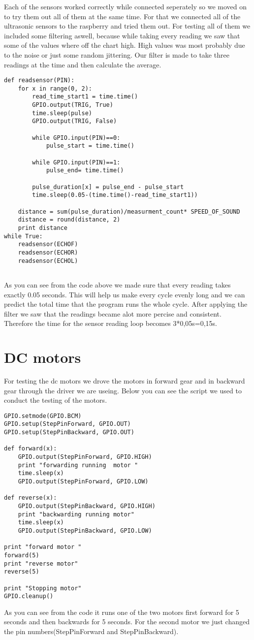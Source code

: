 Each of the sensors worked correctly while connected seperately so we moved on to try them out all of them at the same time.
For that we connected all of the ultrasonic sensors to the raspberry and tried them out.
For testing all of them we included some filtering aswell, because while taking every reading we saw that some of the values where off the chart high.
High values was most probably due to the noise or just some random jittering.
Our filter is made to take three readings at the time and then calculate the average.

\begin{lstlisting}
def readsensor(PIN):
	for x in range(0, 2):
		read_time_start1 = time.time()
		GPIO.output(TRIG, True)
		time.sleep(pulse)
		GPIO.output(TRIG, False)

		while GPIO.input(PIN)==0:
			pulse_start = time.time()

		while GPIO.input(PIN)==1:
			pulse_end= time.time()

		pulse_duration[x] = pulse_end - pulse_start
		time.sleep(0.05-(time.time()-read_time_start1))

	distance = sum(pulse_duration)/measurment_count* SPEED_OF_SOUND
	distance = round(distance, 2)
	print distance
while True:
	readsensor(ECHOF)
	readsensor(ECHOR)
	readsensor(ECHOL)
	
\end{lstlisting}

As you can see from the code above we made sure that every reading takes exactly 0.05 seconds.
This will help us make every cycle evenly long and we can predict the total time that the program runs the whole cycle.
After applying the filter we saw that the readings became alot more percise and consistent.
Therefore the time for the sensor reading loop becomes 3*0,05s=0,15s.

\section{DC motors}

For testing the dc motors we drove the motors in forward gear and in backward gear through the driver we are useing.
Below you can see the script we used to conduct the testing of the motors.

\begin{lstlisting}
GPIO.setmode(GPIO.BCM)
GPIO.setup(StepPinForward, GPIO.OUT)
GPIO.setup(StepPinBackward, GPIO.OUT)

def forward(x):
    GPIO.output(StepPinForward, GPIO.HIGH)
    print "forwarding running  motor "
    time.sleep(x)
    GPIO.output(StepPinForward, GPIO.LOW)

def reverse(x):
    GPIO.output(StepPinBackward, GPIO.HIGH)
    print "backwarding running motor"
    time.sleep(x)
    GPIO.output(StepPinBackward, GPIO.LOW)

print "forward motor "
forward(5)
print "reverse motor"
reverse(5)

print "Stopping motor"
GPIO.cleanup()

\end{lstlisting}

As you can see from the code it runs one of the two motors first forward for 5 seconds and then backwards for 5 seconds.
For the second motor we just changed the pin numbers(StepPinForward and StepPinBackward).
